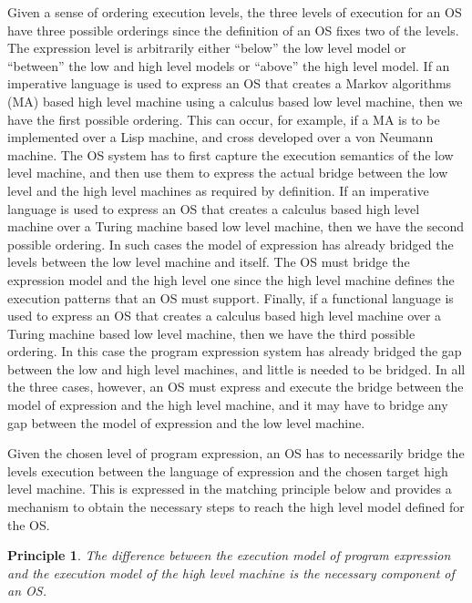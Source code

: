 \documentclass[draft]{article}
\newcounter{theprin}
\newtheorem{principle}[theprin]{Principle}
\begin{document}
Given  a sense  of  ordering  execution levels,  the  three levels  of
execution for an OS have three possible orderings since the definition
of an OS fixes two of the levels.  The expression level is arbitrarily
either ``below'' the  low level model or ``between''  the low and high
level  models or  ``above'' the  high level  model.  If  an imperative
language is  used to  express an OS  that creates a  Markov algorithms
(MA) based  high level  machine using a   calculus  based low
level machine,  then we  have the first  possible ordering.   This can
occur, for example, if a MA  is to be implemented over a Lisp machine,
and cross developed over a von  Neumann machine.  The OS system has to
first capture  the execution semantics  of the low level  machine, and
then use them  to express the actual bridge between  the low level and
the high level  machines as required by definition.   If an imperative
language is  used to express an  OS that creates  a  calculus
based  high  level machine  over  a  Turing  machine based  low  level
machine, then we have the second possible ordering.  In such cases the
model of  expression has  already bridged the  levels between  the low
level machine and itself.  The OS must bridge the expression model and
the high level one since  the high level machine defines the execution
patterns that an  OS must support.  Finally, if  a functional language
is used to express an OS  that creates a  calculus based high
level machine over  a Turing machine based low  level machine, then we
have the third possible ordering.  In this case the program expression
system  has already bridged  the gap  between the  low and  high level
machines, and little is needed to be bridged.  In all the three cases,
however, an OS  must express and execute the  bridge between the model
of expression  and the high level  machine, and it may  have to bridge
any gap between the model of expression and the low level machine.

Given the chosen level of program expression, an OS has to necessarily
bridge the levels execution between the language of expression and the
chosen target high  level machine.  This is expressed  in the matching
principle below and provides a mechanism to obtain the necessary steps
to reach the high level model defined for the OS.
\begin{principle}
  \label{matching:principle}
  The difference between the execution model of program expression and
  the  execution model  of the  high  level machine  is the  necessary
  component of an OS.
\end{principle}
\end{document}
